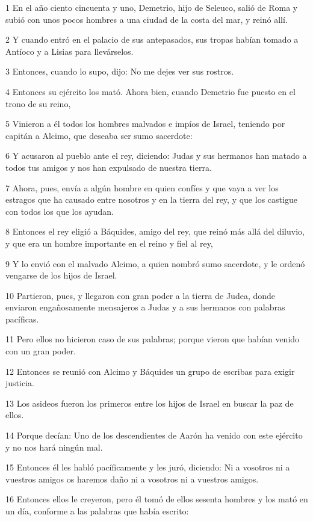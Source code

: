 \par 1 En el año ciento cincuenta y uno, Demetrio, hijo de Seleuco, salió de Roma y subió con unos pocos hombres a una ciudad de la costa del mar, y reinó allí.
\par 2 Y cuando entró en el palacio de sus antepasados, sus tropas habían tomado a Antíoco y a Lisias para llevárselos.
\par 3 Entonces, cuando lo supo, dijo: No me dejes ver sus rostros.
\par 4 Entonces su ejército los mató. Ahora bien, cuando Demetrio fue puesto en el trono de su reino,
\par 5 Vinieron a él todos los hombres malvados e impíos de Israel, teniendo por capitán a Alcimo, que deseaba ser sumo sacerdote:
\par 6 Y acusaron al pueblo ante el rey, diciendo: Judas y sus hermanos han matado a todos tus amigos y nos han expulsado de nuestra tierra.
\par 7 Ahora, pues, envía a algún hombre en quien confíes y que vaya a ver los estragos que ha causado entre nosotros y en la tierra del rey, y que los castigue con todos los que los ayudan.
\par 8 Entonces el rey eligió a Báquides, amigo del rey, que reinó más allá del diluvio, y que era un hombre importante en el reino y fiel al rey,
\par 9 Y lo envió con el malvado Alcimo, a quien nombró sumo sacerdote, y le ordenó vengarse de los hijos de Israel.
\par 10 Partieron, pues, y llegaron con gran poder a la tierra de Judea, donde enviaron engañosamente mensajeros a Judas y a sus hermanos con palabras pacíficas.
\par 11 Pero ellos no hicieron caso de sus palabras; porque vieron que habían venido con un gran poder.
\par 12 Entonces se reunió con Alcimo y Báquides un grupo de escribas para exigir justicia.
\par 13 Los asideos fueron los primeros entre los hijos de Israel en buscar la paz de ellos.
\par 14 Porque decían: Uno de los descendientes de Aarón ha venido con este ejército y no nos hará ningún mal.
\par 15 Entonces él les habló pacíficamente y les juró, diciendo: Ni a vosotros ni a vuestros amigos os haremos daño ni a vosotros ni a vuestros amigos.
\par 16 Entonces ellos le creyeron, pero él tomó de ellos sesenta hombres y los mató en un día, conforme a las palabras que había escrito:
